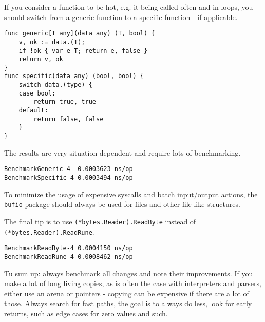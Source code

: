     If you consider a function to be hot, e.g. it being called often and in
    loops, you should switch from a generic function to a specific function -
    if applicable.

    \begin{verbatim}
func generic[T any](data any) (T, bool) {
    v, ok := data.(T);
    if !ok { var e T; return e, false }
    return v, ok
}
func specific(data any) (bool, bool) {
    switch data.(type) {
    case bool:
        return true, true
    default:
        return false, false
    }
}
    \end{verbatim}

    The results are very situation dependent and require lots of benchmarking.

    \begin{verbatim}
BenchmarkGeneric-4  0.0003623 ns/op
BenchmarkSpecific-4 0.0003494 ns/op
    \end{verbatim}

    To minimize the usage of expensive syscalls and batch input/output actions,
    the \texttt{bufio} package should always be used for files and other
    file-like structures.

    The final tip is to use \texttt{(*bytes.Reader).ReadByte} instead of
    \texttt{(*bytes.Reader).ReadRune}.

    \begin{verbatim}
BenchmarkReadByte-4 0.0004150 ns/op
BenchmarkReadRune-4 0.0008462 ns/op
    \end{verbatim}

    Tu sum up: always benchmark all changes and note their improvements. If you
    make a lot of long living copies, as is often the case with interpreters
    and parsers, either use an arena or pointers - copying can be expensive if
    there are a lot of those. Always search for fast paths, the goal is to
    always do less, look for early returns, such as edge cases for zero values
    and such.


